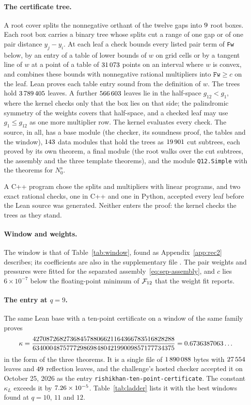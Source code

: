 \documentclass[11pt]{article}
\theoremstyle{definition}
\newcommand{\Fr}{\mathcal{F}}
\begin{document}
\begin{sloppypar}
\paragraph{The certificate tree.}
A root cover splits the nonnegative orthant of the twelve gaps into $9$
root boxes. Each root box carries a binary tree whose splits cut a range of one
gap or of one pair distance $y_j-y_i$. At each leaf a check bounds every listed
pair term of \texttt{Fw} below, by an entry of a table of lower bounds of $w$
on grid cells or by a tangent line of $w$ at a point of a table of $31\,073$
points on an interval where $w$ is convex, and combines these bounds with
nonnegative rational multipliers into $\texttt{Fw}\ge c$ on the leaf. Lean
proves each table entry sound from the definition of $w$. The trees hold
$3\,789\,405$ leaves. A further $566\,603$ leaves lie in the half-space
$g_{12}<g_1$, where the kernel checks only that the box lies on that side;
the palindromic symmetry of the weights covers that half-space, and a checked
leaf may use $g_1\le g_{12}$ as one more multiplier row. The kernel evaluates
every check. The source, \qSource{} in all, has a base module
(the checker, its soundness proof, the tables and the window), $143$
data modules that hold the trees as $19\,901$ cut subtrees, each proved by its
own theorem, a final module (the root walks over the cut subtrees, the
assembly and the three template theorems), and the module
\texttt{Q12.Simple} with the theorems for $N_0^s$.

A C++ program chose the splits and multipliers with linear programs, and two
exact rational checks, one in C++ and one in Python, accepted every leaf before
the Lean source was generated. Neither enters the proof: the kernel checks the
trees as they stand.

\paragraph{Window and weights.}
The window is that of Table~\ref{tab:window}, found as
Appendix~\ref{app:rec2} describes; its coefficients are also in the
supplementary file \qWindowFile. The pair weights and pressures were fitted
for the separated assembly~\eqref{eq:sep-assembly}, and $c$ lies $6\times10^{-7}$ below the floating-point
minimum of $\Fr_{\qQ}$ that the weight fit reports.

\paragraph{The entry at $q=9$.}
The same Lean base with a ten-point certificate on a window of the same family
proves
\[
  \kappa=\frac{427087268273684578806621164366783516828288}
  {634000487577729869848042199009857177734375}=0.6736387063\ldots
\]
in the form of the three theorems. It is a single file of $1\,890\,088$ bytes with
$27\,554$ leaves and $49$ reflection leaves, and the
challenge's hosted checker accepted it on October 25, 2026 as the entry
\texttt{rishikhan-ten-point-certificate}. The constant $\kappa_L$ exceeds it
by $7.26\times10^{-5}$. Table~\ref{tab:ladder} lists it with the best windows found
at $q=10$, $11$ and $12$.


\end{sloppypar}
\end{document}
